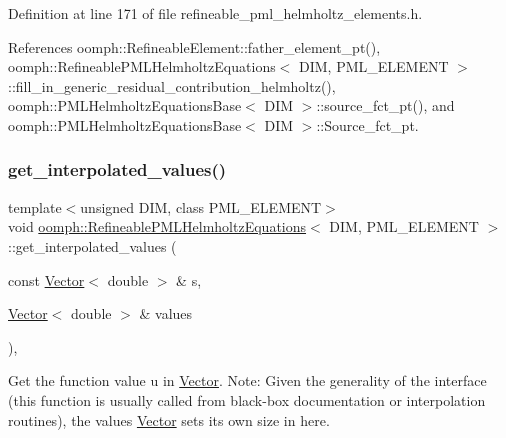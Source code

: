 Definition at line 171 of file refineable\+\_\+pml\+\_\+helmholtz\+\_\+elements.\+h.



References oomph\+::\+Refineable\+Element\+::father\+\_\+element\+\_\+pt(), oomph\+::\+Refineable\+P\+M\+L\+Helmholtz\+Equations$<$ D\+I\+M, P\+M\+L\+\_\+\+E\+L\+E\+M\+E\+N\+T $>$\+::fill\+\_\+in\+\_\+generic\+\_\+residual\+\_\+contribution\+\_\+helmholtz(), oomph\+::\+P\+M\+L\+Helmholtz\+Equations\+Base$<$ D\+I\+M $>$\+::source\+\_\+fct\+\_\+pt(), and oomph\+::\+P\+M\+L\+Helmholtz\+Equations\+Base$<$ D\+I\+M $>$\+::\+Source\+\_\+fct\+\_\+pt.

\mbox{\label{classoomph_1_1RefineablePMLHelmholtzEquations_a19a3644f2c65eba0f55a81f63f54ddf5}} 
\subsubsection{\texorpdfstring{get\+\_\+interpolated\+\_\+values()}{get\_interpolated\_values()}\hspace{0.1cm}{\footnotesize\ttfamily [1/2]}}
{\footnotesize\ttfamily template$<$unsigned D\+IM, class P\+M\+L\+\_\+\+E\+L\+E\+M\+E\+NT$>$ \\
void \hyperlink{classoomph_1_1RefineablePMLHelmholtzEquations}{oomph\+::\+Refineable\+P\+M\+L\+Helmholtz\+Equations}$<$ D\+IM, P\+M\+L\+\_\+\+E\+L\+E\+M\+E\+NT $>$\+::get\+\_\+interpolated\+\_\+values (\begin{DoxyParamCaption}\item[{const \hyperlink{classoomph_1_1Vector}{Vector}$<$ double $>$ \&}]{s,  }\item[{\hyperlink{classoomph_1_1Vector}{Vector}$<$ double $>$ \&}]{values }\end{DoxyParamCaption})\hspace{0.3cm}{\ttfamily [inline]}, {\ttfamily [virtual]}}



Get the function value u in \hyperlink{classoomph_1_1Vector}{Vector}. Note\+: Given the generality of the interface (this function is usually called from black-\/box documentation or interpolation routines), the values \hyperlink{classoomph_1_1Vector}{Vector} sets its own size in here. 



